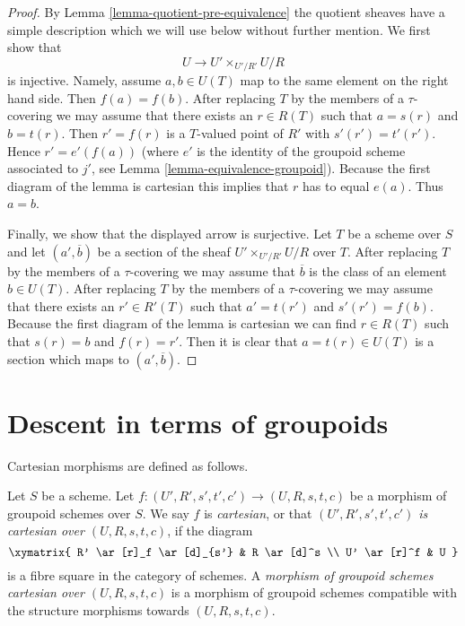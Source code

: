 \begin{proof}
By Lemma \ref{lemma-quotient-pre-equivalence} the quotient sheaves
have a simple description which we will use below without further mention.
We first show that
$$
U \longrightarrow U' \times_{U'/R'} U/R
$$
is injective. Namely, assume $a, b \in U(T)$ map to the same element
on the right hand side. Then $f(a) = f(b)$. After replacing $T$ by the
members of a $\tau$-covering we may assume that there exists an
$r \in R(T)$ such that $a = s(r)$ and $b = t(r)$. Then $r' = f(r)$
is a $T$-valued point of $R'$ with $s'(r') = t'(r')$. Hence
$r' = e'(f(a))$ (where $e'$ is the identity of the groupoid
scheme associated to $j'$, see Lemma \ref{lemma-equivalence-groupoid}).
Because the first diagram of the lemma is cartesian this implies
that $r$ has to equal $e(a)$. Thus $a = b$.

\medskip\noindent
Finally, we show that the displayed arrow is surjective. Let
$T$ be a scheme over $S$ and let $(a', \overline{b})$ be a section
of the sheaf $U' \times_{U'/R'} U/R$ over $T$. After replacing $T$
by the members of a $\tau$-covering we may assume that $\overline{b}$
is the class of an element $b \in U(T)$. After replacing $T$
by the members of a $\tau$-covering we may assume that there exists
an $r' \in R'(T)$ such that $a' = t(r')$ and $s'(r') = f(b)$.
Because the first diagram of the lemma is cartesian we can find
$r \in R(T)$ such that $s(r) = b$ and $f(r) = r'$. Then it is clear
that $a = t(r) \in U(T)$ is a section which maps to
$(a', \overline{b})$.
\end{proof}








\section{Descent in terms of groupoids}
\label{section-groupoids-descent}

\noindent
Cartesian morphisms are defined as follows.

\begin{definition}
\label{definition-cartesian-morphism}
Let $S$ be a scheme. Let $f : (U', R', s', t', c') \to (U, R, s, t, c)$ be
a morphism of groupoid schemes over $S$. We say $f$ is {\it cartesian}, or
that {\it $(U', R', s', t', c')$ is cartesian over $(U, R, s, t, c)$},
if the diagram
$$
\xymatrix{
R' \ar[r]_f \ar[d]_{s'} & R \ar[d]^s \\
U' \ar[r]^f & U
}
$$
is a fibre square in the category of schemes. A {\it morphism of groupoid
schemes cartesian over $(U, R, s, t, c)$} is a morphism of groupoid
schemes compatible with the structure morphisms towards $(U, R, s, t, c)$.
\end{definition}

